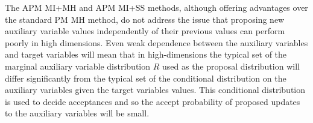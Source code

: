 The \ac{APM} \ac{MI}+\ac{MH} and \ac{APM} \ac{MI}+\ac{SS} methods, although offering advantages over the standard \ac{PM} \ac{MH} method, do not address the issue that proposing new auxiliary variable values independently of their previous values can perform poorly in high dimensions. Even weak dependence between the auxiliary variables and target variables will mean that in high-dimensions the typical set of the  marginal auxiliary variable distribution $R$ used as the proposal distribution will differ significantly from the typical set of the conditional distribution on the auxiliary variables given the target variables values. This conditional distribution is used to decide acceptances and so the accept probability of proposed updates to the auxiliary variables will be small. %


